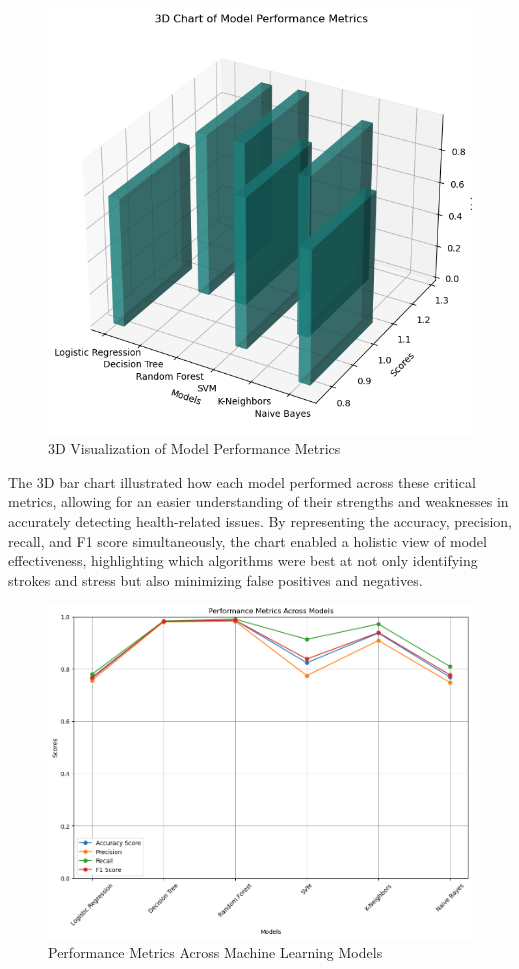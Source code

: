 \documentclass[runningheads]{llncs}
\begin{document}
\begin{enumerate}
\newpage
\begin{figure}
    \centering
    \includegraphics[width=1.0\linewidth]{modeling 2.png}
    \caption{3D Visualization of Model Performance Metrics} 
    \label{fig:enter-label}
\end{figure}

The 3D bar chart illustrated how each model performed across these critical metrics, allowing for an easier understanding of their strengths and weaknesses in accurately detecting health-related issues. By representing the accuracy, precision, recall, and F1 score simultaneously, the chart enabled a holistic view of model effectiveness, highlighting which algorithms were best at not only identifying strokes and stress but also minimizing false positives and negatives.

\newpage
\begin{figure}
    \centering
    \includegraphics[width=1.0\linewidth]{modeling 4.png}
    \caption{Performance Metrics Across Machine Learning Models} 
    \label{fig:enter-label}
\end{figure}


\end{enumerate}
\end{document}
